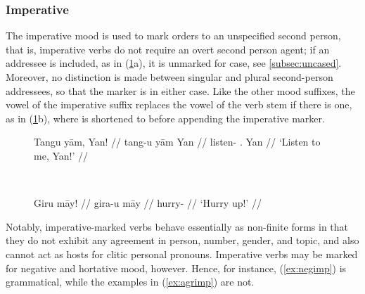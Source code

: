 
\subsubsection{Imperative}

The imperative mood is used to mark orders to an unspecified second person,
that is, imperative verbs do not require an overt second person agent; if an
addressee is included, as in (\ref{ex:impmorph}a), it is unmarked for case,
see \autoref{subsec:uncased}. Moreover, no distinction is made between singular
and plural second-person addressees, so that the marker is  in
either case. Like the other mood suffixes, the vowel of the imperative suffix
replaces the vowel of the verb stem if there is one, as in
(\ref{ex:impmorph}b), where  is shortened to
 before appending the imperative marker.

\begin{figure}[h]
\ex{}\label{ex:impmorph}
\begin{minipage}[t]{.5\remaining}
\tl\quad\begingl
	\gla Tangu yām, Yan! //
	\glb tang-u yām Yan //
	\glc listen-\Imp{} \Fsg{}.\Dat{} Yan //
	\glft `Listen to me, Yan!' //
\endgl
\end{minipage}
~
\begin{minipage}[t]{.5\remaining}
\tl\quad\begingl
	\gla Giru māy! //
	\glb gira-u māy //
	\glc hurry-\Imp{} \Int{} //
	\glft `Hurry up!' //
\endgl
\end{minipage}

\xe
\end{figure}

Notably, imperative-marked verbs behave essentially as non-finite forms in that
they do not exhibit any agreement in person, number, gender, and topic, and also
cannot act as hosts for clitic personal pronouns. Imperative verbs may be marked
for negative and hortative mood, however. Hence, for instance, (\ref{ex:negimp})
is grammatical, while the examples in (\ref{ex:agrimp}) are not.

